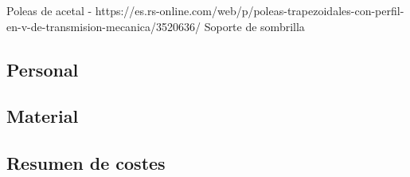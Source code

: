     Poleas de acetal - https://es.rs-online.com/web/p/poleas-trapezoidales-con-perfil-en-v-de-transmision-mecanica/3520636/
     Soporte de sombrilla
\subsection{Personal}

\subsection{Material}

\subsection{Resumen de costes}
